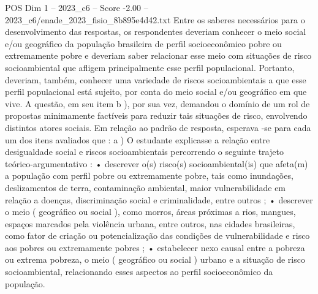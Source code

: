 \begin{textsample}{POS Dim 1 – 2023\_c6 – Score -2.00 – 2023\_c6/enade\_2023\_fisio\_8b895e4d42.txt}
Entre os saberes necessários para o desenvolvimento das respostas, os respondentes deveriam conhecer o meio social e/ou geográfico da população brasileira de perfil socioeconômico pobre ou extremamente pobre e deveriam saber relacionar esse meio com situações de risco socioambiental que afligem principalmente esse perfil populacional.
Portanto, deveriam, também, conhecer uma variedade de riscos socioambientais a que esse perfil populacional está sujeito, por conta do meio social e/ou geográfico em que vive.
A questão, em seu item b ), por sua vez, demandou o domínio de um rol de propostas minimamente factíveis para reduzir tais situações de risco, envolvendo distintos atores sociais.
Em relação ao padrão de resposta, esperava -se para cada um dos itens avaliados que : a ) O estudante explicasse a relação entre desigualdade social e riscos socioambientais percorrendo o seguinte trajeto teórico-argumentativo : • descrever o(s) risco(s) socioambiental(is) que afeta(m) a população com perfil pobre ou extremamente pobre, tais como inundações, deslizamentos de terra, contaminação ambiental, maior vulnerabilidade em relação a doenças, discriminação social e criminalidade, entre outros ; • descrever o meio ( geográfico ou social ), como morros, áreas próximas a rios, mangues, espaços marcados pela violência urbana, entre outros, nas cidades brasileiras, como fator de criação ou potencialização das condições de vulnerabilidade e risco aos pobres ou extremamente pobres ; • estabelecer nexo causal entre a pobreza ou extrema pobreza, o meio ( geográfico ou social ) urbano e a situação de risco socioambiental, relacionando esses aspectos ao perfil socioeconômico da população.

\end{textsample}
